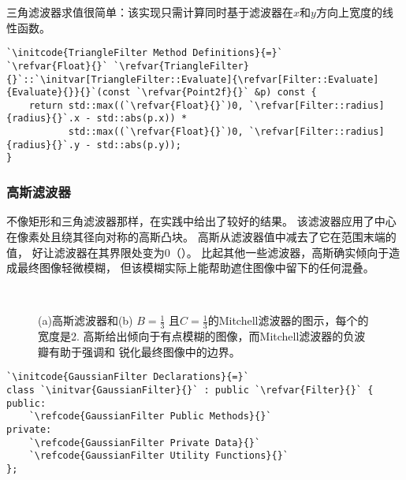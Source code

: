 三角滤波器求值很简单：该实现只需计算同时基于滤波器在$x$和$y$方向上宽度的线性函数。
\begin{lstlisting}
`\initcode{TriangleFilter Method Definitions}{=}`
`\refvar{Float}{}` `\refvar{TriangleFilter}{}`::`\initvar[TriangleFilter::Evaluate]{\refvar[Filter::Evaluate]{Evaluate}{}}{}`(const `\refvar{Point2f}{}` &p) const {
    return std::max((`\refvar{Float}{}`)0, `\refvar[Filter::radius]{radius}{}`.x - std::abs(p.x)) *
           std::max((`\refvar{Float}{}`)0, `\refvar[Filter::radius]{radius}{}`.y - std::abs(p.y));
}
\end{lstlisting}

\subsubsection*{高斯滤波器}
不像矩形和三角滤波器那样，在实践中给出了较好的结果。
该滤波器应用了中心在像素处且绕其径向对称的高斯凸块。
高斯从滤波器值中减去了它在范围末端的值，
好让滤波器在其界限处变为0（）。
比起其他一些滤波器，高斯确实倾向于造成最终图像轻微模糊，
但该模糊实际上能帮助遮住图像中留下的任何混叠。

\begin{figure}[htbp]
    \centering
    \,
    \caption{(a)高斯滤波器和(b) $\displaystyle B=\frac{1}{3}$
        且$\displaystyle C=\frac{1}{3}$的Mitchell滤波器的图示，每个的宽度是2.
        高斯给出倾向于有点模糊的图像，而Mitchell滤波器的负波瓣有助于强调和
        锐化最终图像中的边界。}
    \label{fig:7.43}
\end{figure}

\begin{lstlisting}
`\initcode{GaussianFilter Declarations}{=}`
class `\initvar{GaussianFilter}{}` : public `\refvar{Filter}{}` {
public:
    `\refcode{GaussianFilter Public Methods}{}`
private:
    `\refcode{GaussianFilter Private Data}{}`
    `\refcode{GaussianFilter Utility Functions}{}`
};
\end{lstlisting}

